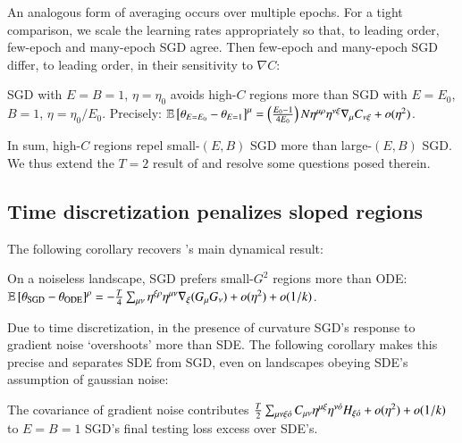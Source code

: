             An analogous form of averaging occurs over multiple epochs.  For a
            tight comparison, we scale the learning rates appropriately so
            that, to leading order, few-epoch and many-epoch SGD agree.  Then
            few-epoch and many-epoch SGD differ, to leading order, in their
            sensitivity to $\nabla C$:
            \begin{cor}[$\sdia{c(01-2)(01-12)}$] \label{cor:epochs}
                SGD with $E=B=1$, $\eta=\eta_0$ avoids high-$C$ regions more
                than SGD with $E=E_0$, $B=1$, $\eta=\eta_0/E_0$.  Precisely:
                $
                    \mathbb{E}\left[\theta_{E=E_0} - \theta_{E=1}\right]^\mu
                        =
                    \left(\frac{E_0-1}{4 E_0}\right) N
                    \eta^{\mu\rho} \eta^{\nu\xi} \nabla_\mu C_{\nu\xi}
                    + o(\eta^2)
                $.
            \end{cor}

            In sum, high-$C$ regions repel small-$(E,B)$ SGD more than
            large-$(E,B)$ SGD.  We thus extend the $T=2$ result of \cite{ro18}
            and resolve some questions posed therein.    

 
        \subsection{Time discretization penalizes sloped regions}
            The following corollary recovers \cite{ba21}'s main dynamical
            result: 
            \begin{cor}[$\sdia{c(0-1-2)(01-12)}$] \label{cor:epochs}
                On a noiseless landscape, SGD prefers small-$G^2$ regions
                more than ODE: 
                $
                    \mathbb{E}\left[\theta_{\text{SGD}} - \theta_{\text{ODE}}\right]^\rho
                        =
                    -\frac{T}{4}
                    \sum_{\mu\nu} \eta^{\xi\rho} \eta^{\mu\nu} \nabla_\xi(G_\mu G_\nu)
                    + o(\eta^2) + o(1/k) 
                $.
            \end{cor}
            Due to time discretization, in the presence of curvature SGD's
            response to gradient noise `overshoots' more than SDE.  The
            following corollary makes this precise and separates SDE from SGD,
            even on landscapes obeying SDE's assumption of gaussian noise:
            \begin{cor}[$\sdia{c(01-2)(02-12)}$] \label{cor:vsode}
                The covariance of gradient noise contributes  
                $
                    \frac{T}{2} \sum_{\mu\nu\xi{\acute{o}}} C_{\mu\nu} \eta^{\mu\xi}\eta^{\nu{\acute{o}}}
                    H_{\xi{\acute{o}}} + o(\eta^2) + o(1/k) 
                $  
                to $E=B=1$ SGD's final testing loss excess over SDE's.
            \end{cor}

